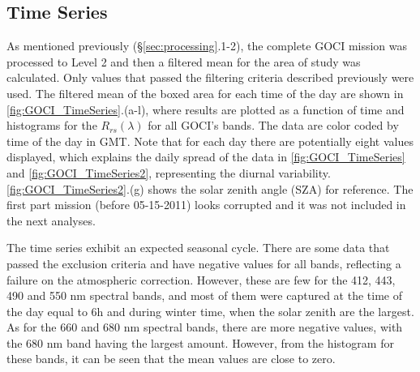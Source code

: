 \documentclass[onecolumn,3p,letterpaper,11pt]{elsarticle}
\begin{document}
\subsection{Time Series}\label{subsec:timeseries}
As mentioned previously (\S\ref{sec:processing}.1-2), the complete GOCI mission was processed to Level 2 and then a filtered mean for the area of study was calculated. Only values that passed the filtering criteria described previously were used. The filtered mean of the boxed area for each time of the day are shown in \autoref{fig:GOCI_TimeSeries}.(a-l), where results are plotted as a function of time and histograms for the $R_{rs}(\lambda)$ for all GOCI's bands. The data are color coded by time of the day in GMT. Note that for each day there are potentially eight values displayed, which explains the daily spread of the data in \autoref{fig:GOCI_TimeSeries} and \autoref{fig:GOCI_TimeSeries2}, representing the diurnal variability.  \autoref{fig:GOCI_TimeSeries2}.(g) shows the solar zenith angle (SZA) for reference. The first part mission (before 05-15-2011) looks corrupted and it was not included in the next analyses.

The time series exhibit an expected seasonal cycle. 
There are some data that passed the exclusion criteria and have negative values for all bands, reflecting a failure on the atmospheric correction. However, these are few for the 412, 443, 490 and 550 nm spectral bands, and most of them were captured at the time of the day equal to 6h and during winter time, when the solar zenith are the largest. As for the 660 and 680 nm spectral bands, there are more negative values, with the 680 nm band having the largest amount. However, from the histogram for these bands, it can be seen that the mean values are close to zero.
\end{document}
